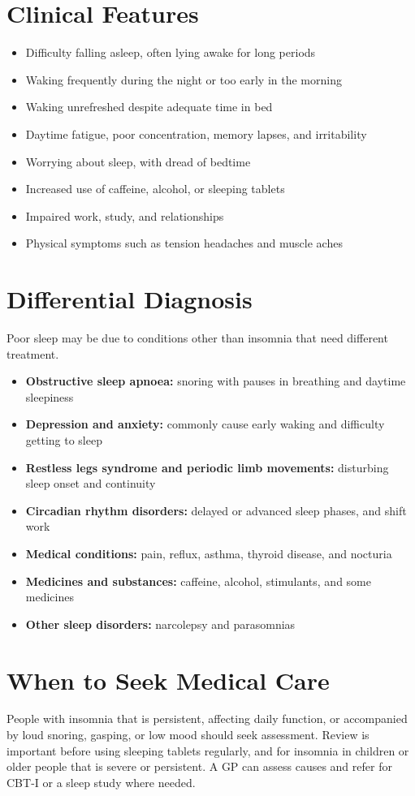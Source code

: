 \section*{Clinical Features}
\begin{itemize}
    \item Difficulty falling asleep, often lying awake for long periods
    \item Waking frequently during the night or too early in the morning
    \item Waking unrefreshed despite adequate time in bed
    \item Daytime fatigue, poor concentration, memory lapses, and irritability
    \item Worrying about sleep, with dread of bedtime
    \item Increased use of caffeine, alcohol, or sleeping tablets
    \item Impaired work, study, and relationships
    \item Physical symptoms such as tension headaches and muscle aches
\end{itemize}

\section*{Differential Diagnosis}
Poor sleep may be due to conditions other than insomnia that need different treatment.
\begin{itemize}
    \item \textbf{Obstructive sleep apnoea:} snoring with pauses in breathing and daytime sleepiness
    \item \textbf{Depression and anxiety:} commonly cause early waking and difficulty getting to sleep
    \item \textbf{Restless legs syndrome and periodic limb movements:} disturbing sleep onset and continuity
    \item \textbf{Circadian rhythm disorders:} delayed or advanced sleep phases, and shift work
    \item \textbf{Medical conditions:} pain, reflux, asthma, thyroid disease, and nocturia
    \item \textbf{Medicines and substances:} caffeine, alcohol, stimulants, and some medicines
    \item \textbf{Other sleep disorders:} narcolepsy and parasomnias
\end{itemize}

\section*{When to Seek Medical Care}
People with insomnia that is persistent, affecting daily function, or accompanied by loud snoring, gasping, or low mood should seek assessment. Review is important before using sleeping tablets regularly, and for insomnia in children or older people that is severe or persistent. A GP can assess causes and refer for CBT-I or a sleep study where needed.

